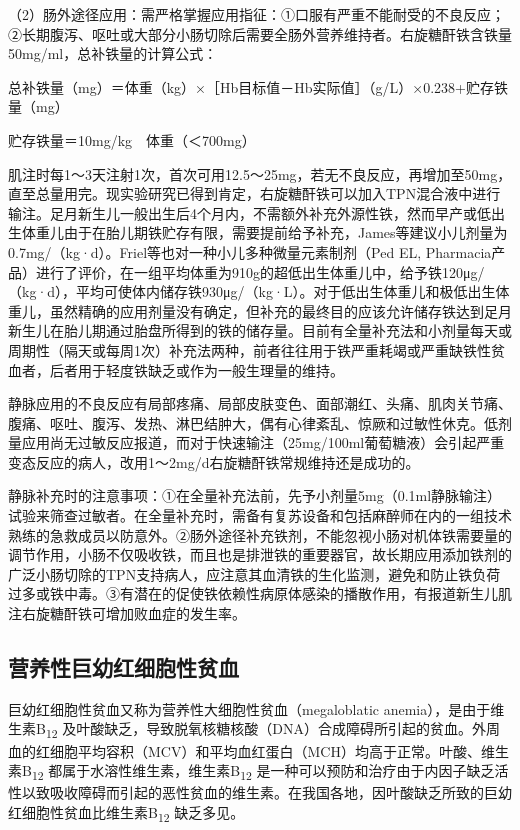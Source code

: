 （2）肠外途径应用：需严格掌握应用指征：①口服有严重不能耐受的不良反应；②长期腹泻、呕吐或大部分小肠切除后需要全肠外营养维持者。右旋糖酐铁含铁量50mg/ml，总补铁量的计算公式：

总补铁量（mg）＝体重（kg）×［Hb目标值－Hb实际值］（g/L）×0.238+贮存铁量（mg）

贮存铁量＝10mg/kg　体重（＜700mg）

肌注时每1～3天注射1次，首次可用12.5～25mg，若无不良反应，再增加至50mg，直至总量用完。现实验研究已得到肯定，右旋糖酐铁可以加入TPN混合液中进行输注。足月新生儿一般出生后4个月内，不需额外补充外源性铁，然而早产或低出生体重儿由于在胎儿期铁贮存有限，需要提前给予补充，James等建议小儿剂量为0.7mg/（kg·d）。Friel等也对一种小儿多种微量元素制剂（Ped
EL,
Pharmacia产品）进行了评价，在一组平均体重为910g的超低出生体重儿中，给予铁120μg/（kg·d），平均可使体内储存铁930μg/（kg·L）。对于低出生体重儿和极低出生体重儿，虽然精确的应用剂量没有确定，但补充的最终目的应该允许储存铁达到足月新生儿在胎儿期通过胎盘所得到的铁的储存量。目前有全量补充法和小剂量每天或周期性（隔天或每周1次）补充法两种，前者往往用于铁严重耗竭或严重缺铁性贫血者，后者用于轻度铁缺乏或作为一般生理量的维持。

静脉应用的不良反应有局部疼痛、局部皮肤变色、面部潮红、头痛、肌肉关节痛、腹痛、呕吐、腹泻、发热、淋巴结肿大，偶有心律紊乱、惊厥和过敏性休克。低剂量应用尚无过敏反应报道，而对于快速输注（25mg/100ml葡萄糖液）会引起严重变态反应的病人，改用1～2mg/d右旋糖酐铁常规维持还是成功的。

静脉补充时的注意事项：①在全量补充法前，先予小剂量5mg（0.1ml静脉输注）试验来筛查过敏者。在全量补充时，需备有复苏设备和包括麻醉师在内的一组技术熟练的急救成员以防意外。②肠外途径补充铁剂，不能忽视小肠对机体铁需要量的调节作用，小肠不仅吸收铁，而且也是排泄铁的重要器官，故长期应用添加铁剂的广泛小肠切除的TPN支持病人，应注意其血清铁的生化监测，避免和防止铁负荷过多或铁中毒。③有潜在的促使铁依赖性病原体感染的播散作用，有报道新生儿肌注右旋糖酐铁可增加败血症的发生率。

\hypertarget{text00003.htmlux5cux23mllj27}{%
\subsection{营养性巨幼红细胞性贫血}\label{text00003.htmlux5cux23mllj27}}

巨幼红细胞性贫血又称为营养性大细胞性贫血（megaloblatic
anemia），是由于维生素B\textsubscript{12}
及叶酸缺乏，导致脱氧核糖核酸（DNA）合成障碍所引起的贫血。外周血的红细胞平均容积（MCV）和平均血红蛋白（MCH）均高于正常。叶酸、维生素B\textsubscript{12}
都属于水溶性维生素，维生素B\textsubscript{12}
是一种可以预防和治疗由于内因子缺乏活性以致吸收障碍而引起的恶性贫血的维生素。在我国各地，因叶酸缺乏所致的巨幼红细胞性贫血比维生素B\textsubscript{12}
缺乏多见。

